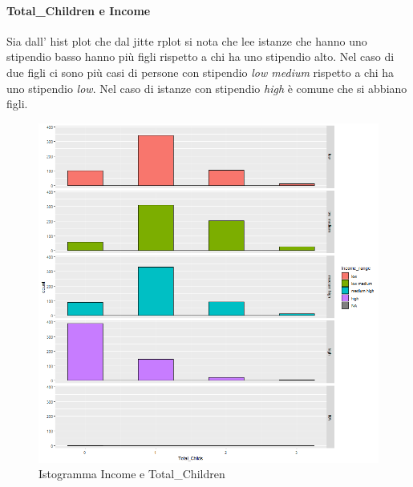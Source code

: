 \documentclass[letterpaper,11pt]{article}
\begin{document}
\newpage

\paragraph{Total\_Children e Income}

Sia dall' hist plot che dal jitte rplot si nota che lee istanze che hanno uno stipendio basso hanno più figli rispetto a chi ha uno stipendio alto. Nel caso di due figli ci sono più casi di persone con stipendio \textit{low medium} rispetto a chi ha uno stipendio \textit{low}. 
Nel caso di istanze con stipendio \textit{high} è comune che si abbiano figli. 

\begin{figure}[h!]
\begin{minipage}[c]{0.4\linewidth}
\includegraphics[width=\linewidth]{Img/EDA/EDA013.png}
\caption{Istogramma Income e Total\_Children}
\label{fig:IstogrammaTcIncome}
\end{minipage}
\hfill
\begin{minipage}[c]{0.4\linewidth}

\end{minipage}
\end{figure}
\end{document}
